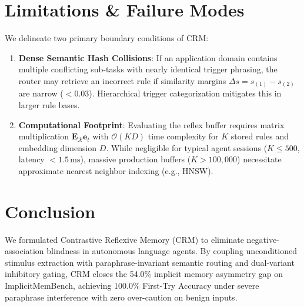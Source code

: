 \documentclass[10pt,conference]{IEEEtran}
\begin{document}
\section{Limitations \& Failure Modes}

We delineate two primary boundary conditions of CRM:
\begin{enumerate}
    \item \textbf{Dense Semantic Hash Collisions}: If an application domain contains multiple conflicting sub-tasks with nearly identical trigger phrasing, the router may retrieve an incorrect rule if similarity margins $\Delta s = s_{(1)} - s_{(2)}$ are narrow ($< 0.03$). Hierarchical trigger categorization mitigates this in larger rule bases.
    \item \textbf{Computational Footprint}: Evaluating the reflex buffer requires matrix multiplication $\mathbf{E}_{\mathcal{R}} \mathbf{e}_t$ with $\mathcal{O}(KD)$ time complexity for $K$ stored rules and embedding dimension $D$. While negligible for typical agent sessions ($K \le 500$, latency $< 1.5\,\text{ms}$), massive production buffers ($K > 100{,}000$) necessitate approximate nearest neighbor indexing (e.g., HNSW).
\end{enumerate}

\section{Conclusion}

We formulated Contrastive Reflexive Memory (CRM) to eliminate negative-association blindness in autonomous language agents. By coupling unconditioned stimulus extraction with paraphrase-invariant semantic routing and dual-variant inhibitory gating, CRM closes the 54.0\% implicit memory asymmetry gap on ImplicitMemBench, achieving 100.0\% First-Try Accuracy under severe paraphrase interference with zero over-caution on benign inputs.



\end{document}
